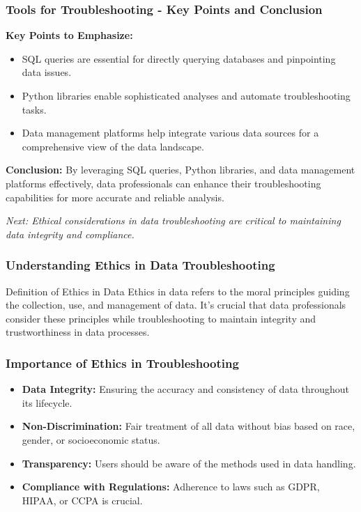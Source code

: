 \documentclass{beamer}
\begin{document}
\begin{frame}[fragile]
    \frametitle{Tools for Troubleshooting - Key Points and Conclusion}
    
    \textbf{Key Points to Emphasize:}
    \begin{itemize}
        \item SQL queries are essential for directly querying databases and pinpointing data issues.
        \item Python libraries enable sophisticated analyses and automate troubleshooting tasks.
        \item Data management platforms help integrate various data sources for a comprehensive view of the data landscape.
    \end{itemize}

    \textbf{Conclusion:} By leveraging SQL queries, Python libraries, and data management platforms effectively, data professionals can enhance their troubleshooting capabilities for more accurate and reliable analysis.

    \textit{Next: Ethical considerations in data troubleshooting are critical to maintaining data integrity and compliance.}
\end{frame}

\begin{frame}[fragile]
    \frametitle{Understanding Ethics in Data Troubleshooting}
    \begin{block}{Definition of Ethics in Data}
        Ethics in data refers to the moral principles guiding the collection, use, and management of data. It's crucial that data professionals consider these principles while troubleshooting to maintain integrity and trustworthiness in data processes.
    \end{block}
\end{frame}

\begin{frame}[fragile]
    \frametitle{Importance of Ethics in Troubleshooting}
    \begin{itemize}
        \item \textbf{Data Integrity:} Ensuring the accuracy and consistency of data throughout its lifecycle.
        \item \textbf{Non-Discrimination:} Fair treatment of all data without bias based on race, gender, or socioeconomic status.
        \item \textbf{Transparency:} Users should be aware of the methods used in data handling.
        \item \textbf{Compliance with Regulations:} Adherence to laws such as GDPR, HIPAA, or CCPA is crucial.
    \end{itemize}
\end{frame}
\end{document}
